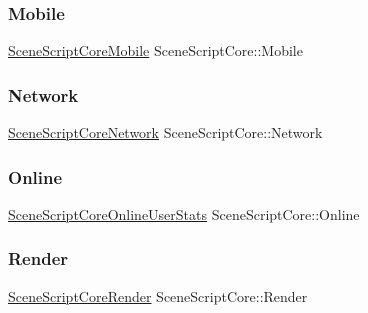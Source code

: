 \subsubsection{\texorpdfstring{Mobile}{Mobile}}
{\footnotesize\ttfamily \hyperlink{class_scene_script_core_mobile}{Scene\+Script\+Core\+Mobile} Scene\+Script\+Core\+::\+Mobile}

\hypertarget{class_scene_script_core_a2c1f634ac8a093804f3c6b407938d3ff}{}\label{class_scene_script_core_a2c1f634ac8a093804f3c6b407938d3ff} 
\subsubsection{\texorpdfstring{Network}{Network}}
{\footnotesize\ttfamily \hyperlink{class_scene_script_core_network}{Scene\+Script\+Core\+Network} Scene\+Script\+Core\+::\+Network}

\hypertarget{class_scene_script_core_afe20b74b2126d47e5e2beb273c5f06ee}{}\label{class_scene_script_core_afe20b74b2126d47e5e2beb273c5f06ee} 
\subsubsection{\texorpdfstring{Online}{Online}}
{\footnotesize\ttfamily \hyperlink{class_scene_script_core_online_user_stats}{Scene\+Script\+Core\+Online\+User\+Stats} Scene\+Script\+Core\+::\+Online}

\hypertarget{class_scene_script_core_a2de11f0c7d18078d0a62f55f2a018a32}{}\label{class_scene_script_core_a2de11f0c7d18078d0a62f55f2a018a32} 
\subsubsection{\texorpdfstring{Render}{Render}}
{\footnotesize\ttfamily \hyperlink{class_scene_script_core_render}{Scene\+Script\+Core\+Render} Scene\+Script\+Core\+::\+Render}

\hypertarget{class_scene_script_core_a4f4bbd9f194bf418b208ee2976d15691}{}\label{class_scene_script_core_a4f4bbd9f194bf418b208ee2976d15691} 
